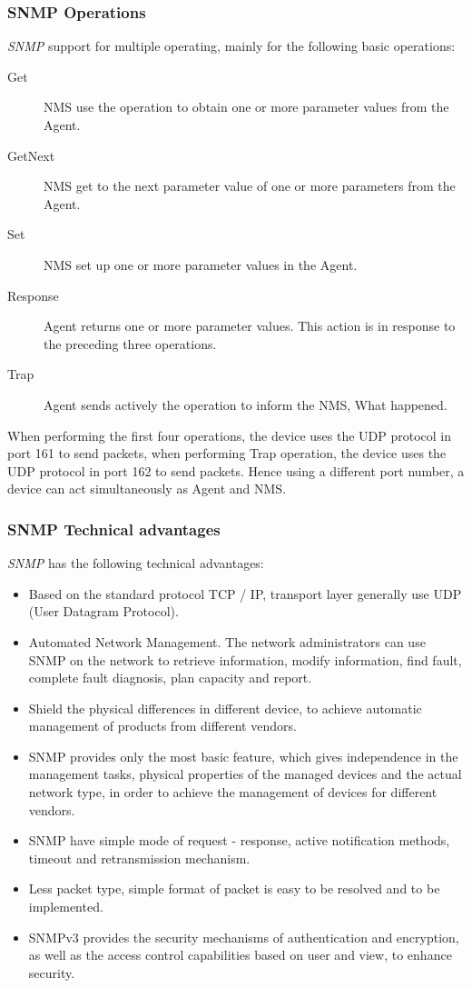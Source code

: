 \subsubsection{SNMP Operations}

\textit{SNMP} support for multiple operating, mainly for the following basic operations:

\begin{description}
	\item[Get] NMS use the operation to obtain one or more parameter values from the Agent.
	\item[GetNext] NMS get to the next parameter value of one or more parameters from the Agent.
	\item[Set] NMS set up one or more parameter values in the Agent.
	\item[Response] Agent returns one or more parameter values. This action is in response to the preceding three operations.
	\item[Trap] Agent sends actively the operation to inform the NMS, What happened.
\end{description}

When performing the first four operations, the device uses the UDP protocol in port 161 to send packets, when performing Trap operation, the device uses the UDP protocol in port 162 to send packets. Hence using a different port number, a device can act simultaneously as Agent and NMS.

\subsubsection{SNMP Technical advantages}

\textit{SNMP} has the following technical advantages:  

\begin{itemize}
	\item Based on the standard protocol TCP / IP, transport layer generally use UDP (User Datagram Protocol).  
	\item Automated Network Management. The network administrators can use SNMP on the network to retrieve information, modify information, find fault, complete fault diagnosis, plan capacity and report.  
	\item Shield the physical differences in different device, to achieve automatic management of products from different vendors.  
	\item SNMP provides only the most basic feature, which gives independence in the management tasks, physical properties of the managed devices and the actual network type, in order to achieve the management of devices for different vendors.  
	\item SNMP have simple mode of request - response, active notification methods, timeout and retransmission mechanism.  
	\item Less packet type, simple format of packet is easy to be resolved and to be implemented.  
	\item SNMPv3 provides the security mechanisms of authentication and encryption, as well as the access control capabilities based on user and view, to enhance security.
\end{itemize}

